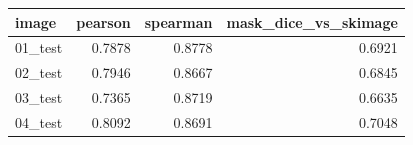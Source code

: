 \begin{tabular}{lrrr}
\toprule
image & pearson & spearman & mask_dice_vs_skimage \\
\midrule
01_test & 0.7878 & 0.8778 & 0.6921 \\
02_test & 0.7946 & 0.8667 & 0.6845 \\
03_test & 0.7365 & 0.8719 & 0.6635 \\
04_test & 0.8092 & 0.8691 & 0.7048 \\
\bottomrule
\end{tabular}
